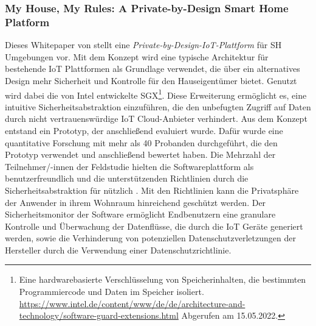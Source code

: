         \subsubsection*{My House, My Rules: A Private-by-Design Smart Home Platform}
            Dieses Whitepaper von \cite{Zavalyshyn2020} stellt eine \textit{Private-by-Design-IoT-Plattform} für \acl{SH} 
            Umgebungen vor. Mit dem Konzept wird eine typische Architektur für bestehende \acs{IoT} Plattformen als Grundlage 
            verwendet, die über ein alternatives Design mehr Sicherheit und Kontrolle für den Hauseigentümer bietet. 
            Genutzt wird dabei die von Intel entwickelte \ac{SGX}\footnote{Eine hardwarebasierte Verschlüsselung von Speicherinhalten, die bestimmten Programmiercode und Daten im Speicher isoliert. \url{https://www.intel.de/content/www/de/de/architecture-and-technology/software-guard-extensions.html} Abgerufen am 15.05.2022.}. 
            Diese Erweiterung ermöglicht es, eine intuitive Sicherheitsabstraktion einzuführen, die den unbefugten Zugriff auf Daten 
            durch nicht vertrauenswürdige \acs{IoT} Cloud-Anbieter verhindert. Aus dem Konzept entstand ein Prototyp, der anschließend evaluiert wurde. 
            Dafür wurde eine quantitative Forschung mit mehr als 40 Probanden durchgeführt, die 
            den Prototyp verwendet und anschließend bewertet haben. Die Mehrzahl der Teilnehmer/-innen der Feldstudie 
            hielten die Softwareplattform als benutzerfreundlich und die unterstützenden Richtlinien durch die Sicherheitsabstraktion 
            für nützlich \cite{Zavalyshyn2020}. Mit den Richtlinien kann die Privatsphäre der Anwender in ihrem Wohnraum hinreichend 
            geschützt werden. Der Sicherheitsmonitor der Software ermöglicht Endbenutzern eine granulare Kontrolle und Überwachung 
            der Datenflüsse, die durch die \acs{IoT} Geräte generiert werden, sowie die Verhinderung von potenziellen 
            Datenschutzverletzungen der Hersteller durch die Verwendung einer Datenschutzrichtlinie. 

